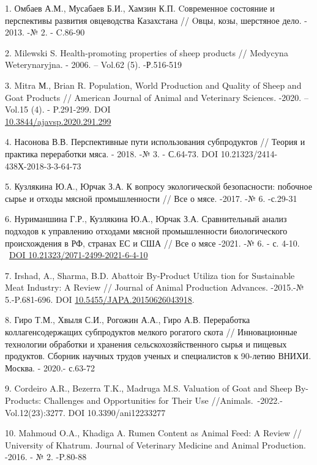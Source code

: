 \begin{refs}
1. Омбаев А.М., Мусабаев Б.И., Хамзин К.П. Cовременное состояние и
перспективы развития овцеводства Казахстана // Oвцы, козы, шерстяное
дело. - 2013. -№ 2. - C.86-90

2. Milewski S. Health-promoting properties of sheep products // Medycyna
Weterynaryjna. - 2006. -- Vol.62 (5). -Р.516-519

3. Mitra М., Brian R. Population, World Production and Quality of Sheep
and Goat Products // American Journal of Animal and Veterinary Sciences.
-2020. -- Vol.15 (4). - P.291-299. DOI\\
\href{https://doi.org/10.3844/ajavsp.2020.291.299}{10.3844/ajavsp.2020.291.299}

4. Насонова В.В. Перспективные пути использования субпродуктов // Теория
и практика переработки мяса. - 2018. -№ 3. - С.64-73. DOI
10.21323/2414-438Х-2018-3-3-64-73

5. Кузлякина Ю.А., Юрчак З.А. К вопросу экологической безопасности:
побочное сырье и отходы мясной промышленности // Все о мясе. -2017. -№
6. -с.29-31

6. Нуриманшина Г.Р., Кузлякина Ю.А., Юрчак З.А. Сравнительный анализ
подходов к управлению отходами мясной промышленности биологического
происхождения в РФ, странах ЕС и США // Все о мясе -2021. -№ 6. - с.
4-10. ~\href{https://doi.org/10.21323/2071-2499-2021-6-4-10}{DOI
10.21323/2071-2499-2021-6-4-10}

7. Irshad, A., Sharma, B.D. Abattoir By‑Product Utiliza tion for
Sustainable Meat Industry: A Review // Journal of Animal Production
Advances. -2015.-№ 5.-P.681-696.
DOI \href{https://doi.org/10.5455/JAPA.20150626043918}{10.5455/JAPA.20150626043918}.

8. Гиро Т.М., Хвыля С.И., Рогожин А.А., Гиро А.В. Переработка
коллагенсодержащих субпродуктов мелкого рогатого скота // Инновационные
технологии обработки и хранения сельскохозяйственного сырья и пищевых
продуктов. Сборник научных трудов ученых и специалистов к 90-летию
ВНИХИ. Москва. - 2020.- с.63-72

9. Cordeiro A.R., Bezerra T.K., Madruga M.S. Valuation of Goat and Sheep
By-Products: Challenges and Opportunities for Their Use
//Animals.~-2022.-Vol.12(23):3277. DOI 10.3390/ani12233277

10. Mahmoud O.A., Khadiga A. Rumen Content as Animal Feed: A Review //
University of Khatrum. Journal of Veterinary Medicine and Animal
Production. -2016. - № 2. -P.80-88
\end{refs}

